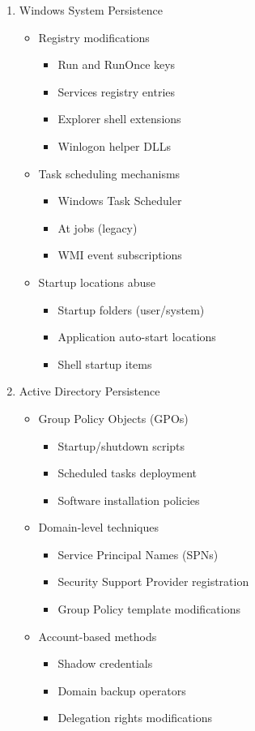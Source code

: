 \begin{enumerate}
    \item Windows System Persistence
    \begin{itemize}
        \item Registry modifications
        \begin{itemize}
            \item Run and RunOnce keys
            \item Services registry entries
            \item Explorer shell extensions
            \item Winlogon helper DLLs
        \end{itemize}
        \item Task scheduling mechanisms
        \begin{itemize}
            \item Windows Task Scheduler
            \item At jobs (legacy)
            \item WMI event subscriptions
        \end{itemize}
        \item Startup locations abuse
        \begin{itemize}
            \item Startup folders (user/system)
            \item Application auto-start locations
            \item Shell startup items
        \end{itemize}
    \end{itemize}
    \item Active Directory Persistence
    \begin{itemize}
        \item Group Policy Objects (GPOs)
        \begin{itemize}
            \item Startup/shutdown scripts
            \item Scheduled tasks deployment
            \item Software installation policies
        \end{itemize}
        \item Domain-level techniques
        \begin{itemize}
            \item Service Principal Names (SPNs)
            \item Security Support Provider registration
            \item Group Policy template modifications
        \end{itemize}
        \item Account-based methods
        \begin{itemize}
            \item Shadow credentials
            \item Domain backup operators
            \item Delegation rights modifications
        \end{itemize}
    \end{itemize}
\end{enumerate}


